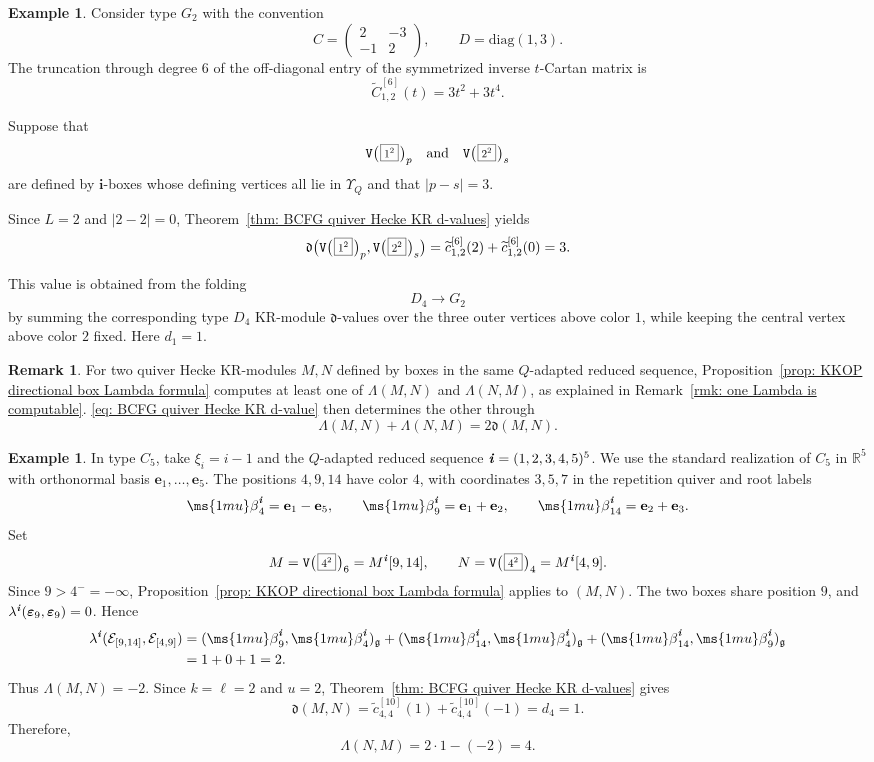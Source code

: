 \documentclass[12pt, leqno]{amsart}
\numberwithin{equation}{section}
\theoremstyle{plain}
\theoremstyle{definition}
\newtheorem{remark}[lemma]{Remark}
\newtheorem{example}[lemma]{Example}
\newcommand{\Vkm}[1]{%
  \ttV\bigl(\hspace{0.2ex}\scalebox{.8}{\(\boxed{#1}\)}\hspace{0.2ex}\bigr)%
}
\newcommand{\g}{\mathfrak{g}}
\newcommand{\be}{{\ms{1mu}\beta}}
\newcommand{\ve}{\boldsymbol{\varepsilon}}
\newcommand{\de}{\mathfrak{d}}
\newcommand{\ii}{ \textbf{\textit{i}}}
\newcommand{\tC}{\widetilde{C}}
\newcommand{\tc}{\widetilde{c}}
\newcommand{\bfe}{\mathbf{e}}
\newcommand{\bfi}{\mathbf{i}}
\newcommand{\calE}{\mathcal{E}}
\newcommand{\ttV}{\mathtt{V}}
\newcommand{\diag}{\mathrm{diag}}
\newcommand{\qtq}[1][{and}]{\quad\text{{#1}}\quad}
\begin{document}
\begin{example}\label{ex: type G2 folded KR d-value}
Consider type \(G_2\) with the convention
\[
C=
\begin{pmatrix}
2&-3\\
-1&2
\end{pmatrix},
\qquad
D=\diag(1,3).
\]
The truncation through degree \(6\) of the off-diagonal entry
of the symmetrized inverse \(t\)-Cartan matrix is 
\[
\tC_{1,2}^{[6]}(t) = 3t^2+3t^4.
\]

Suppose that
\[
\Vkm{1^2}_p \qtq \Vkm{2^2}_s
\]
are defined by \(\bfi\)-boxes whose defining vertices all lie in
\(\Upsilon_Q\) and that
$|p-s|=3$. 

Since $L=2$ and $|2-2|=0$, 
Theorem~\ref{thm: BCFG quiver Hecke KR d-values} yields
\[
\de\bigl( \Vkm{1^2}_p, \Vkm{2^2}_s \bigr) = \tc_{1,2}^{[6]}(2) + \tc_{1,2}^{[6]}(0) = 3.
\]

This value is obtained from the folding
\[
D_4\longrightarrow G_2
\] 
by summing the corresponding type \(D_4\) KR-module
\(\de\)-values over the three outer vertices above color \(1\),
while keeping the central vertex above color \(2\) fixed.
Here \(d_1=1\). 
\end{example}

\begin{remark} \label{rmk: Lambda computable}
For two quiver Hecke KR-modules \(M,N\) defined by boxes
in the same \(Q\)-adapted reduced sequence,
Proposition~\ref{prop: KKOP directional box Lambda formula}
computes at least one of \(\Lambda(M,N)\) and
\(\Lambda(N,M)\), as explained in
Remark~\ref{rmk: one Lambda is computable}. 
\eqref{eq: BCFG quiver Hecke KR d-value}
then determines the other through
\[
\Lambda(M,N)+\Lambda(N,M)=2\de(M,N).
\]
\end{remark}

\begin{example}\label{ex: overlapping boxes directional Lambda}
In type \(C_5\), take \(\xi_i=i-1\) and the
\(Q\)-adapted reduced sequence \(\ii=(1,2,3,4,5)^5\).
We use the standard realization of \(C_5\) in
\(\mathbb R^5\) with orthonormal basis \(\bfe_1,\ldots,\bfe_5\).
The positions \(4,9,14\) have color \(4\), with
coordinates \(3,5,7\) in the repetition quiver and root labels
\[
\be_4^\ii=\bfe_1-\bfe_5,\qquad
\be_9^\ii=\bfe_1+\bfe_2,\qquad
\be_{14}^\ii=\bfe_2+\bfe_3.
\]
Set
\[
M=\Vkm{4^2}_{6}=M^\ii[9,14],
\qquad
N=\Vkm{4^2}_{4}=M^\ii[4,9].
\]
Since \(9>4^-=-\infty\),
Proposition~\ref{prop: KKOP directional box Lambda formula}
applies to \((M,N)\).
The two boxes share position \(9\), and
\(\lambda^\ii(\ve_9,\ve_9)=0\).  Hence
\[
\begin{aligned}
\lambda^\ii(\calE_{[9,14]},\calE_{[4,9]})
&=(\be_9^\ii,\be_4^\ii)_\g
  +(\be_{14}^\ii,\be_4^\ii)_\g
  +(\be_{14}^\ii,\be_9^\ii)_\g\\
&=1+0+1=2.
\end{aligned}
\]
Thus \(\Lambda(M,N)=-2\).
Since \(k=\ell=2\) and \(u=2\),
Theorem~\ref{thm: BCFG quiver Hecke KR d-values} gives
\[
\de(M,N)=\tc_{4,4}^{[10]}(1)
+\tc_{4,4}^{[10]}(-1)=d_4=1.
\]
Therefore,
\[
\Lambda(N,M)=2\cdot1-(-2)=4.
\]
\end{example}
\end{document}
